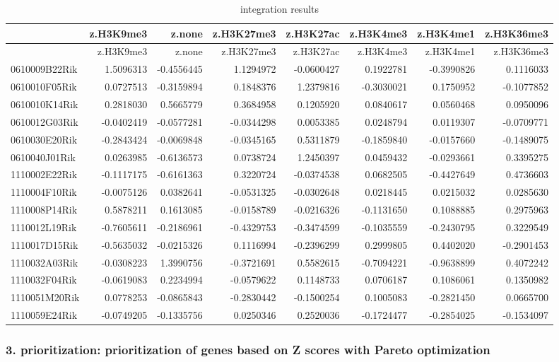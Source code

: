 \documentclass[10pt,]{article}
\begin{document}
\begin{longtable}[]{@{}lrrrrrrr@{}}
\caption{integration results}\tabularnewline
\toprule
& z.H3K9me3 & z.none & z.H3K27me3 & z.H3K27ac & z.H3K4me3 & z.H3K4me1 &
z.H3K36me3\tabularnewline
\midrule
\endfirsthead
\toprule
& z.H3K9me3 & z.none & z.H3K27me3 & z.H3K27ac & z.H3K4me3 & z.H3K4me1 &
z.H3K36me3\tabularnewline
\midrule
\endhead
0610009B22Rik & 1.5096313 & -0.4556445 & 1.1294972 & -0.0600427 &
0.1922781 & -0.3990826 & 0.1116033\tabularnewline
0610010F05Rik & 0.0727513 & -0.3159894 & 0.1848376 & 1.2379816 &
-0.3030021 & 0.1750952 & -0.1077852\tabularnewline
0610010K14Rik & 0.2818030 & 0.5665779 & 0.3684958 & 0.1205920 &
0.0840617 & 0.0560468 & 0.0950096\tabularnewline
0610012G03Rik & -0.0402419 & -0.0577281 & -0.0344298 & 0.0053385 &
0.0248794 & 0.0119307 & -0.0709771\tabularnewline
0610030E20Rik & -0.2843424 & -0.0069848 & -0.0345165 & 0.5311879 &
-0.1859840 & -0.0157660 & -0.1489075\tabularnewline
0610040J01Rik & 0.0263985 & -0.6136573 & 0.0738724 & 1.2450397 &
0.0459432 & -0.0293661 & 0.3395275\tabularnewline
1110002E22Rik & -0.1117175 & -0.6161363 & 0.3220724 & -0.0374538 &
0.0682505 & -0.4427649 & 0.4736603\tabularnewline
1110004F10Rik & -0.0075126 & 0.0382641 & -0.0531325 & -0.0302648 &
0.0218445 & 0.0215032 & 0.0285630\tabularnewline
1110008P14Rik & 0.5878211 & 0.1613085 & -0.0158789 & -0.0216326 &
-0.1131650 & 0.1088885 & 0.2975963\tabularnewline
1110012L19Rik & -0.7605611 & -0.2186961 & -0.4329753 & -0.3474599 &
-0.1035559 & -0.2430795 & 0.3229549\tabularnewline
1110017D15Rik & -0.5635032 & -0.0215326 & 0.1116994 & -0.2396299 &
0.2999805 & 0.4402020 & -0.2901453\tabularnewline
1110032A03Rik & -0.0308223 & 1.3990756 & -0.3721691 & 0.5582615 &
-0.7094221 & -0.9638899 & 0.4072242\tabularnewline
1110032F04Rik & -0.0619083 & 0.2234994 & -0.0579622 & 0.1148733 &
0.0706187 & 0.1086061 & 0.1350982\tabularnewline
1110051M20Rik & 0.0778253 & -0.0865843 & -0.2830442 & -0.1500254 &
0.1005083 & -0.2821450 & 0.0665700\tabularnewline
1110059E24Rik & -0.0749205 & -0.1335756 & 0.0250346 & 0.2520036 &
-0.1724477 & -0.2854025 & -0.1534097\tabularnewline
\bottomrule
\end{longtable}

\newpage

\hypertarget{prioritization-prioritization-of-genes-based-on-z-scores-with-pareto-optimization}{%
\subsubsection{\texorpdfstring{3. \textbf{prioritization}:
prioritization of genes based on Z scores with Pareto
optimization}{3. prioritization: prioritization of genes based on Z scores with Pareto optimization}}\label{prioritization-prioritization-of-genes-based-on-z-scores-with-pareto-optimization}}
\end{document}

